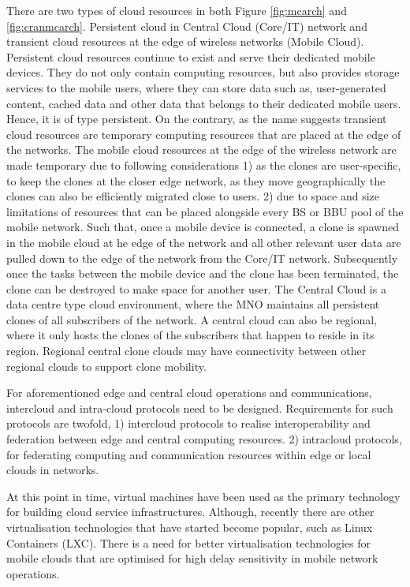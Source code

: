 \documentclass[12pt,journal,compsoc, onecolumn]{IEEEtran}
\begin{document}
There are two types of cloud resources in both Figure \ref{fig:mcarch} and \ref{fig:cranmcarch}. Persistent cloud in Central Cloud (Core/IT) network and transient cloud resources at the edge of wireless networks (Mobile Cloud). Persistent cloud resources continue to exist and serve their dedicated mobile devices. They do not only contain computing resources, but also provides storage services to the mobile users, where they can store data such as, user-generated content, cached data and other data that belongs to their dedicated mobile users. Hence, it is of type persistent. On the contrary, as the name suggests transient cloud resources are temporary computing resources that are placed at the edge of the networks. The mobile cloud resources at the edge of the wireless network are made temporary due to following considerations 1)  as the clones are user-specific, to keep the clones at the closer edge network, as they move geographically the clones can also be efficiently migrated close to users. 2) due to space and size limitations of resources that can be placed alongside every BS or BBU pool of the mobile network. Such that, once a mobile device is connected, a clone is spawned in the mobile cloud at he edge of the network and all other relevant user data are pulled down to the edge of the network from the Core/IT network. Subsequently once the tasks between the mobile device and the clone has been terminated, the clone can be destroyed to make space for another user. The Central Cloud is a data centre type cloud environment, where the MNO maintains all persistent clones of all subscribers of the network. A central cloud can also be regional, where it only hosts the clones of the subscribers that happen to reside in its region. Regional central clone clouds may have connectivity between other regional clouds to support clone mobility. 

For aforementioned edge and central cloud operations and communications, intercloud \cite{5072540} and intra-cloud protocols need to be designed. Requirements for such protocols are twofold, 1) intercloud protocols to realise interoperability and federation between edge and central computing resources. 2) intracloud protocols, for federating computing and communication resources within edge or local clouds in networks.

At this point in time, virtual machines have been used as the primary technology for building cloud service infrastructures. Although, recently there are other virtualisation technologies that have started become popular, such as Linux Containers (LXC). There is a need for better virtualisation technologies for mobile clouds that are optimised for high delay sensitivity in mobile network operations. 
\end{document}
